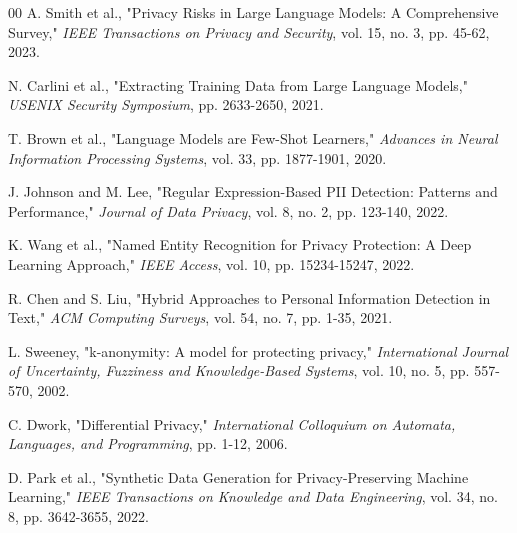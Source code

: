 \documentclass[conference]{IEEEtran}
\begin{document}
\begin{thebibliography}{00}
 A. Smith et al., "Privacy Risks in Large Language Models: A Comprehensive Survey," \textit{IEEE Transactions on Privacy and Security}, vol. 15, no. 3, pp. 45-62, 2023.

 N. Carlini et al., "Extracting Training Data from Large Language Models," \textit{USENIX Security Symposium}, pp. 2633-2650, 2021.

 T. Brown et al., "Language Models are Few-Shot Learners," \textit{Advances in Neural Information Processing Systems}, vol. 33, pp. 1877-1901, 2020.

 J. Johnson and M. Lee, "Regular Expression-Based PII Detection: Patterns and Performance," \textit{Journal of Data Privacy}, vol. 8, no. 2, pp. 123-140, 2022.

 K. Wang et al., "Named Entity Recognition for Privacy Protection: A Deep Learning Approach," \textit{IEEE Access}, vol. 10, pp. 15234-15247, 2022.

 R. Chen and S. Liu, "Hybrid Approaches to Personal Information Detection in Text," \textit{ACM Computing Surveys}, vol. 54, no. 7, pp. 1-35, 2021.

 L. Sweeney, "k-anonymity: A model for protecting privacy," \textit{International Journal of Uncertainty, Fuzziness and Knowledge-Based Systems}, vol. 10, no. 5, pp. 557-570, 2002.

 C. Dwork, "Differential Privacy," \textit{International Colloquium on Automata, Languages, and Programming}, pp. 1-12, 2006.

 D. Park et al., "Synthetic Data Generation for Privacy-Preserving Machine Learning," \textit{IEEE Transactions on Knowledge and Data Engineering}, vol. 34, no. 8, pp. 3642-3655, 2022.
\end{thebibliography}
\end{document}
